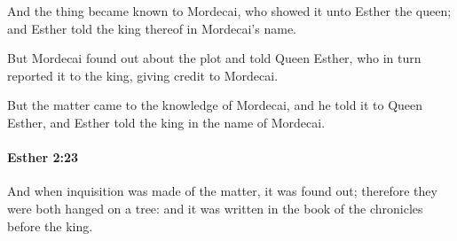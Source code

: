 			\begin{versebox}
					\item[BHS] 
					\item[LXX] 
					\item[ASV] And the thing became known to Mordecai, who showed it unto Esther the queen; and Esther told the king thereof in Mordecai's name.
					\item[NIV] But Mordecai found out about the plot and told Queen Esther, who in turn reported it to the king, giving credit to Mordecai.
					\item[NRSV] But the matter came to the knowledge of Mordecai, and he told it to Queen Esther, and Esther told the king in the name of Mordecai.
			\end{versebox}

		\paragraph{Esther 2:23} %
			\label{ESTHER-2-23}

			And when inquisition was made of the matter, it was found out; therefore they were both hanged on a tree: and it was written in the book of the chronicles before the king.

